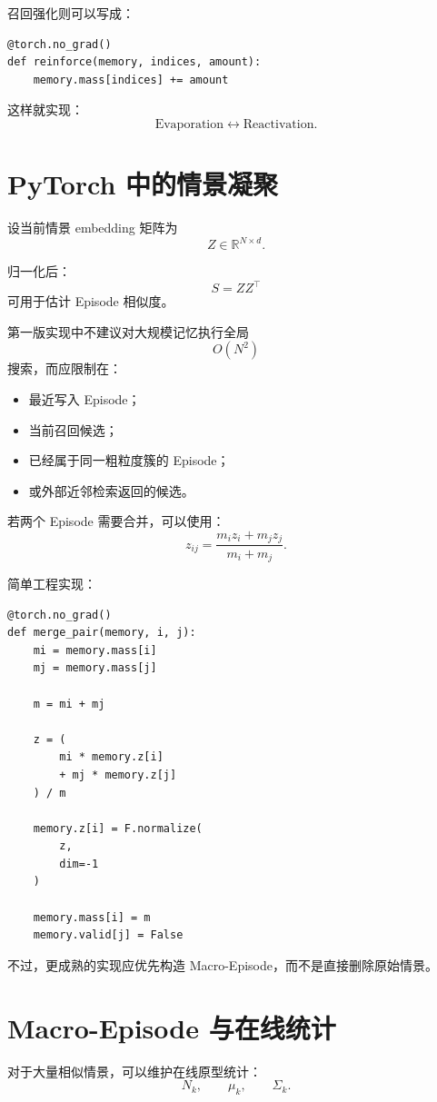召回强化则可以写成：

\begin{verbatim}
@torch.no_grad()
def reinforce(memory, indices, amount):
    memory.mass[indices] += amount
\end{verbatim}

这样就实现：
\[
\boxed{
\mathrm{Evaporation}
\leftrightarrow
\mathrm{Reactivation}.
}
\]

\section{PyTorch 中的情景凝聚}

设当前情景 embedding 矩阵为
\[
Z\in\mathbb R^{N\times d}.
\]

归一化后：
\[
S
=
ZZ^\top
\]
可用于估计 Episode 相似度。

第一版实现中不建议对大规模记忆执行全局
\[
O(N^2)
\]
搜索，而应限制在：

\begin{itemize}
    \item 最近写入 Episode；
    \item 当前召回候选；
    \item 已经属于同一粗粒度簇的 Episode；
    \item 或外部近邻检索返回的候选。
\end{itemize}

若两个 Episode 需要合并，可以使用：
\[
z_{ij}
=
\frac{
m_i z_i+m_j z_j
}{
m_i+m_j
}.
\]

简单工程实现：

\begin{verbatim}
@torch.no_grad()
def merge_pair(memory, i, j):
    mi = memory.mass[i]
    mj = memory.mass[j]

    m = mi + mj

    z = (
        mi * memory.z[i]
        + mj * memory.z[j]
    ) / m

    memory.z[i] = F.normalize(
        z,
        dim=-1
    )

    memory.mass[i] = m
    memory.valid[j] = False
\end{verbatim}

不过，更成熟的实现应优先构造 Macro-Episode，而不是直接删除原始情景。

\section{Macro-Episode 与在线统计}

对于大量相似情景，可以维护在线原型统计：
\[
N_k,
\qquad
\mu_k,
\qquad
\Sigma_k.
\]

